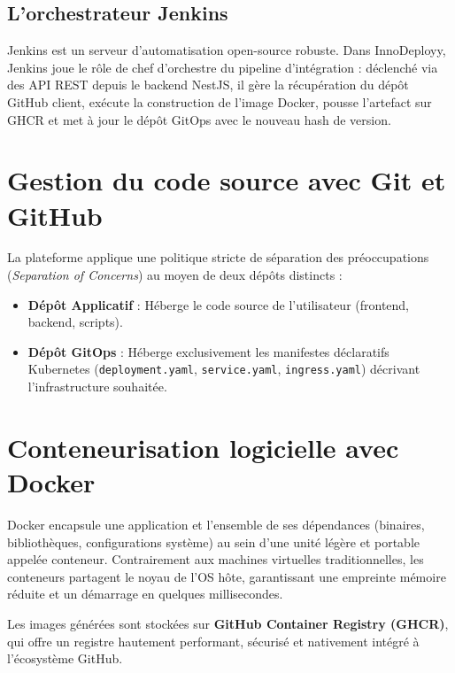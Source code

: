 \documentclass[12pt,a4paper,oneside]{report}
\begin{document}
\subsection{L'orchestrateur Jenkins}
Jenkins est un serveur d'automatisation open-source robuste. Dans InnoDeployy, Jenkins joue le rôle de chef d'orchestre du pipeline d'intégration : déclenché via des API REST depuis le backend NestJS, il gère la récupération du dépôt GitHub client, exécute la construction de l'image Docker, pousse l'artefact sur GHCR et met à jour le dépôt GitOps avec le nouveau hash de version.

\section{Gestion du code source avec Git et GitHub}
La plateforme applique une politique stricte de séparation des préoccupations (\textit{Separation of Concerns}) au moyen de deux dépôts distincts :
\begin{itemize}[label=$\bullet$]
    \item \textbf{Dépôt Applicatif} : Héberge le code source de l'utilisateur (frontend, backend, scripts).
    \item \textbf{Dépôt GitOps} : Héberge exclusivement les manifestes déclaratifs Kubernetes (\texttt{deployment.yaml}, \texttt{service.yaml}, \texttt{ingress.yaml}) décrivant l'infrastructure souhaitée.
\end{itemize}

\section{Conteneurisation logicielle avec Docker}
Docker encapsule une application et l'ensemble de ses dépendances (binaires, bibliothèques, configurations système) au sein d'une unité légère et portable appelée conteneur. Contrairement aux machines virtuelles traditionnelles, les conteneurs partagent le noyau de l'OS hôte, garantissant une empreinte mémoire réduite et un démarrage en quelques millisecondes. 

Les images générées sont stockées sur \textbf{GitHub Container Registry (GHCR)}, qui offre un registre hautement performant, sécurisé et nativement intégré à l'écosystème GitHub.
\end{document}

